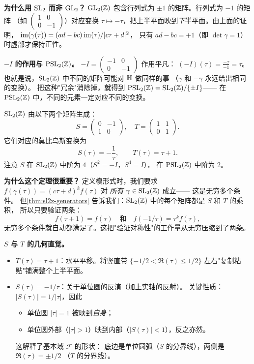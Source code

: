 \textbf{为什么用 $\mathrm{SL}_2$ 而非 $\mathrm{GL}_2$？}
$\mathrm{GL}_2(\mathbb{Z})$ 包含行列式为 $\pm 1$ 的矩阵。行列式为 $-1$ 的矩阵
（如 $\begin{pmatrix} 1 & 0 \\ 0 & -1 \end{pmatrix}$）对应变换
$\tau \mapsto -\tau$，把上半平面映到\emph{下}半平面。由上面的证明，
$\operatorname{im}(\gamma(\tau)) = (ad - bc)\operatorname{im}(\tau)/|c\tau + d|^2$，
只有 $ad - bc = +1$（即 $\det \gamma = 1$）时虚部才保持正性。

\textbf{$-I$ 的作用与 $\mathrm{PSL}_2(\mathbb{Z})$。}
$-I = \begin{pmatrix} -1 & 0 \\ 0 & -1 \end{pmatrix}$ 作用平凡：
$(-I)(\tau) = \frac{-\tau}{-1} = \tau$。
也就是说，$\SL_2(\Z)$ 中不同的矩阵可能对 $\mathbb{H}$ 做同样的事
（$\gamma$ 和 $-\gamma$ 永远给出相同的变换）。
把这种"冗余"消除掉，就得到
$\mathrm{PSL}_2(\mathbb{Z}) = \mathrm{SL}_2(\mathbb{Z})/\{\pm I\}$——
在 $\mathrm{PSL}_2(\mathbb{Z})$ 中，不同的元素一定对应不同的变换。

\begin{theorem}[$\SL_2(\Z)$ 的生成元]
\label{thm:sl2z-generators}
$\SL_2(\Z)$ 由以下两个矩阵生成：
\[
  S = \begin{pmatrix} 0 & -1 \\ 1 & 0 \end{pmatrix}, \quad
  T = \begin{pmatrix} 1 & 1 \\ 0 & 1 \end{pmatrix}.
\]
它们对应的莫比乌斯变换为
\[
  S(\tau) = -\frac{1}{\tau}, \qquad T(\tau) = \tau + 1.
\]
注意 $S$ 在 $\SL_2(\Z)$ 中阶为 $4$（$S^2 = -I$，$S^4 = I$），
在 $\mathrm{PSL}_2(\mathbb{Z})$ 中阶为 $2$。
\end{theorem}

\textbf{为什么这个定理很重要？}
定义模形式时，我们要求 $f(\gamma(\tau)) = (c\tau+d)^k f(\tau)$ 对
\emph{所有} $\gamma \in \mathrm{SL}_2(\mathbb{Z})$ 成立——
这是无穷多个条件。
但\cref{thm:sl2z-generators} 告诉我们：$\SL_2(\Z)$ 中的每个矩阵都是 $S$ 和 $T$ 的乘积，
所以只要验证两条：
\[
  f(\tau + 1) = f(\tau) \quad \text{和} \quad f(-1/\tau) = \tau^k f(\tau),
\]
无穷多个条件就自动都满足了。这把"验证对称性"的工作量从无穷压缩到了两条。

\textbf{$S$ 与 $T$ 的几何直觉。}
\label{rem:S-T-geometry}
\begin{itemize}
  \item $T(\tau) = \tau + 1$：水平平移。将竖直带
    $\{-1/2 < \Re(\tau) \leq 1/2\}$ 左右"复制粘贴"铺满整个上半平面。
  \item $S(\tau) = -1/\tau$：关于单位圆的反演（加上实轴的反射）。
    关键性质：$|S(\tau)| = 1/|\tau|$，因此
    \begin{itemize}
      \item 单位圆 $|\tau| = 1$ 被映到\emph{自身}；
      \item 单位圆外部（$|\tau| > 1$）映到内部（$|S(\tau)| < 1$），反之亦然。
    \end{itemize}
    这解释了基本域 $\mathcal{F}$ 的形状：
    底边是单位圆弧（$S$ 的分界线），两侧是 $\Re(\tau) = \pm 1/2$
    （$T$ 的分界线）。
\end{itemize}

